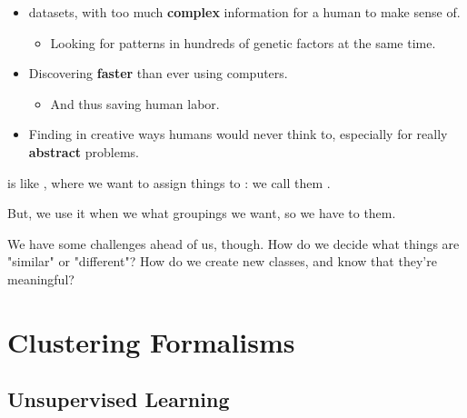         \begin{itemize}
            \item {} datasets, with too much \textbf{complex} information for a human to make sense of.
                \begin{itemize}
                    \item \miniex Looking for patterns in hundreds of genetic factors at the same time.
                \end{itemize}
            
            \item Discovering  \textbf{faster} than ever using computers.
                \begin{itemize}
                    \item And thus saving human labor.
                \end{itemize}
            
            \item Finding  in creative ways humans would never think to, especially for really \textbf{abstract} problems.\\
        \end{itemize}
    
        \begin{concept}
             is like , where we want to assign things to : we call them .
            
            But, we use it when we  what groupings we want, so we have to  them.
        \end{concept}
        
        We have some challenges ahead of us, though. How do we decide what things are "similar" or "different"? How do we create new classes, and know that they're meaningful?
        
        

\pagebreak

\section{Clustering Formalisms}

    \subsection{Unsupervised Learning}
        
